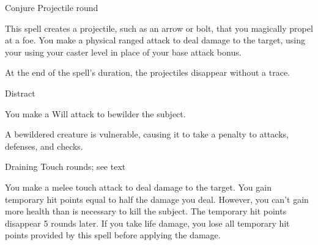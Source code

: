 \begin{spellsection}{Conjure Projectile}
     round
    \begin{spelleffect}
        This spell creates a projectile, such as an arrow or bolt, that you magically propel at a foe. You make a physical ranged attack to deal damage to the target, using your using your caster level in place of your base attack bonus.
    \end{spelleffect}
    \begin{spellnotes}
        At the end of the spell's duration, the projectiles disappear without a trace.
    \end{spellnotes}
\end{spellsection}

\begin{spellsection}{Distract}
    \spelldur \durshort
    \begin{spellhealthy}
        You make a Will attack to bewilder the subject.
    \end{spellhealthy}
    \begin{spellnotes}
        A bewildered creature is vulnerable, causing it to take a  penalty to attacks, defenses, and checks.
    \end{spellnotes}
\end{spellsection}

\begin{spellsection}{Draining Touch}
     rounds; see text
    \begin{spelleffect}
        You make a melee touch attack to deal damage to the target. You gain temporary hit points equal to half the damage you deal. However, you can't gain more health than is necessary to kill the subject. The temporary hit points disappear 5 rounds later. If you take life damage, you lose all temporary hit points provided by this spell before applying the damage.
    \end{spelleffect}
\end{spellsection}

